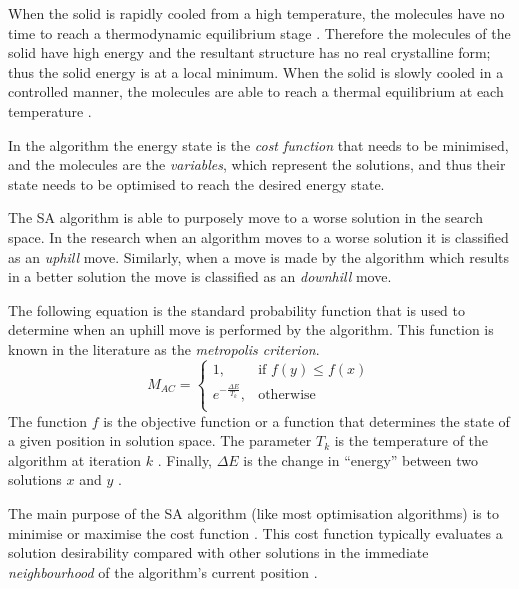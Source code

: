 When the solid is rapidly cooled from a high temperature, the molecules have no time to reach a thermodynamic equilibrium stage \cite{MobileRobotSA,ConstantTempSA}. Therefore the molecules of the solid have high energy and the resultant structure has no real crystalline form; thus the solid energy is at a local minimum\cite{CurveFittingSA,NewSAs,MobileRobotSA}. When the solid is slowly cooled in a controlled manner, the molecules are able to reach a thermal equilibrium at each temperature \cite{ChaosSA,CurveFittingSA,NewSAs}.

In the algorithm the energy state is the \emph{cost function} that needs to be minimised, and the molecules are the \emph{variables}, which represent the solutions, and thus their state needs to be optimised to reach the desired energy state.

The SA algorithm is able to purposely move to a worse solution in the search space\cite{EcoEquilSA}. In the research when an algorithm moves to a worse solution it is classified as an \emph{uphill} move\cite{AIModernApproach}. Similarly, when a move is made by the algorithm which results in a better solution the move is classified as an \emph{downhill} move\cite{AIModernApproach}.

The following equation is the standard probability function that is used to determine when an uphill move is performed by the algorithm. This function is known in the literature as the \emph{metropolis criterion}. 
\begin{equation}
\label{eq:saprobability}
	M_{AC} =
	\begin{cases}
	1, &\text{if $f(y) \leq f(x)$}\\
	e^{-\frac{\Delta E}{T_k}} , &\text{otherwise}\\
	\end{cases}
\end{equation}
The function $f$ is the objective function or a function that determines the state of a given position in solution space\cite{EcoEquilSA}. The parameter $T_k$ is the temperature of the algorithm at iteration $k$ \cite{EcoEquilSA}. Finally, $\Delta E$ is the change in ``energy'' between two solutions $x$ and $y$ \cite{EcoEquilSA}.

The main purpose of the SA algorithm (like most optimisation algorithms) is to minimise or maximise the cost function \cite{SASingleMultiObj}. This cost function typically evaluates a solution desirability compared with other solutions in the immediate \emph{neighbourhood} of the algorithm's current position \cite{TheoPraticalSA}. 

